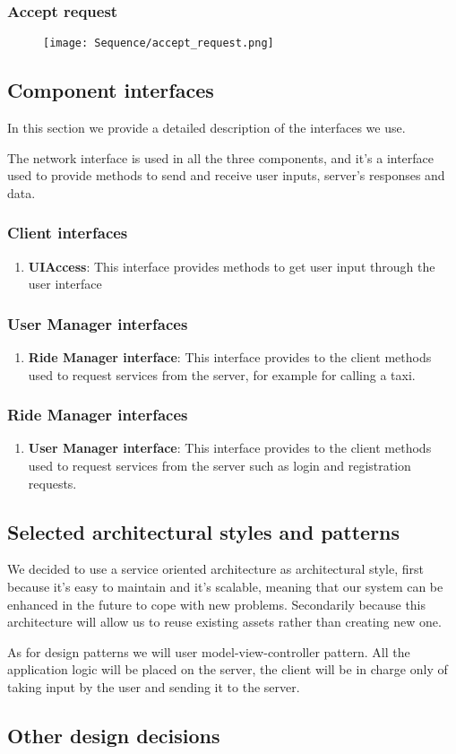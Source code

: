 	\subsubsection{Accept request}
	\begin{figure}[h!]
		\centering
		\texttt{[image: Sequence/accept\_request.png]}
	\end{figure}
	\newpage		


\subsection{Component interfaces}
In this section we provide a detailed description of the interfaces we use.

The network interface is used in all the three components, and it's a interface used to provide methods to send and receive user inputs, server's responses and data.
\subsubsection{Client interfaces}
\begin{enumerate}
	\item \textbf{UIAccess}: This interface provides methods to get user input through the user interface
\end{enumerate}
\subsubsection{User Manager interfaces}
\begin{enumerate}
	\item \textbf{Ride Manager interface}: This interface provides to the client methods used to request services from the server, for example for calling a taxi.
\end{enumerate}
\subsubsection{Ride Manager interfaces}
	\begin{enumerate}
		\item \textbf{User Manager interface}: This interface provides to the client methods used to request services from the server such as login and registration requests.
	\end{enumerate}
	
\subsection{Selected architectural styles and patterns}
We decided to use a service oriented architecture as architectural style, first because it's easy to maintain and it's scalable, meaning that our system can be enhanced in the future to cope with new problems.
Secondarily because this architecture will allow us to reuse existing assets rather than creating new one.

As for design patterns we will user model-view-controller pattern. All the application logic will be placed on the server, the client will be in charge only of taking input by the user and sending it to the server.
\subsection{Other design decisions}